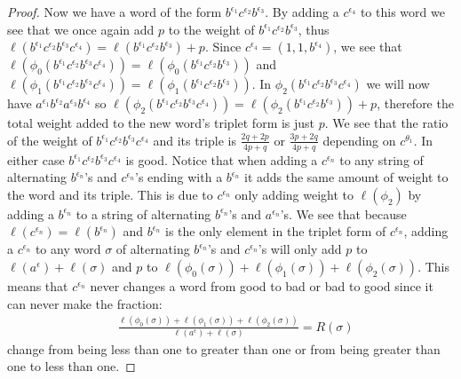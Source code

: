 \documentclass[11pt]{amsart}
\theoremstyle{definition}
\theoremstyle{remark}
\numberwithin{equation}{section}
\begin{document}
\begin{proof}
Now we have a word of the form $b^{\epsilon_1}c^{\epsilon_2}b^{\epsilon_3}$.  By adding a $c^{\epsilon_4}$ to this word we see that we once again add $p$ to the weight of $b^{\epsilon_1}c^{\epsilon_2}b^{\epsilon_3}$, thus  $\ell(b^{\epsilon_1}c^{\epsilon_2}b^{\epsilon_3}c^{\epsilon_4})=\ell(b^{\epsilon_1}c^{\epsilon_2}b^{\epsilon_3})+p$.  Since $c^{\epsilon_4}=(1,1,b^{\epsilon_4})$, we see that $\ell(\phi_0(b^{\epsilon_1}c^{\epsilon_2}b^{\epsilon_3}c^{\epsilon_4}))=\ell(\phi_0(b^{\epsilon_1}c^{\epsilon_2}b^{\epsilon_3}))$ and $\ell(\phi_1(b^{\epsilon_1}c^{\epsilon_2}b^{\epsilon_3}c^{\epsilon_4}))=\ell(\phi_1(b^{\epsilon_1}c^{\epsilon_2}b^{\epsilon_3}))$.  In $\phi_2(b^{\epsilon_1}c^{\epsilon_2}b^{\epsilon_3}c^{\epsilon_4})$ we will now have $a^{\epsilon_1}b^{\epsilon_2}a^{\epsilon_3}b^{\epsilon_4}$ so $\ell(\phi_2(b^{\epsilon_1}c^{\epsilon_2}b^{\epsilon_3}c^{\epsilon_4}))=\ell(\phi_2(b^{\epsilon_1}c^{\epsilon_2}b^{\epsilon_3}))+p$, therefore the total weight added to the new word's triplet form is just $p$.     We see that the ratio of the weight of $b^{\epsilon_1}c^{\epsilon_2}b^{\epsilon_3}c^{\epsilon_4}$ and its triple is $\frac{2q+2p}{4p+q}$ or $\frac{3p+2q}{4p+q}$ depending on $c^{\theta_1}$.  In either case $b^{\epsilon_1}c^{\epsilon_2}b^{\epsilon_3}c^{\epsilon_4}$ is good.  Notice that when adding a $c^{\epsilon_n}$ to any string of alternating $b^{\epsilon_n}$'s and $c^{\epsilon_n}$'s ending with a $b^{\epsilon_n}$ it adds the same amount of weight to the word and its triple.  This is due to $c^{\epsilon_n}$ only adding weight to $\ell(\phi_2)$ by adding a $b^{\epsilon_n}$ to a string of alternating $b^{\epsilon_n}$'s and $a^{\epsilon_n}$'s.  We see that because $\ell(c^{\epsilon_n})=\ell(b^{\epsilon_n})$ and $b^{\epsilon_n}$ is the only element in the triplet form of $c^{\epsilon_n}$, adding a $c^{\epsilon_n}$ to any word $\sigma$ of alternating $b^{\epsilon_n}$'s and $c^{\epsilon_n}$'s will only add $p$ to $\ell(a^{\epsilon})+\ell(\sigma)$ and $p$ to $\ell(\phi_0(\sigma))+\ell(\phi_1(\sigma))+\ell(\phi_2(\sigma))$.  This means that $c^{\epsilon_n}$ never changes a word from good to bad or bad to good since it can never make the fraction:  
\begin{align*}
& \frac{\ell(\phi_0(\sigma))+\ell(\phi_1(\sigma))+\ell(\phi_2(\sigma))}{\ell(a^{\epsilon})+\ell(\sigma)}=R(\sigma)
\end{align*}
change from being less than one to greater than one or from being greater than one to less than one.


\end{proof}
\end{document}
